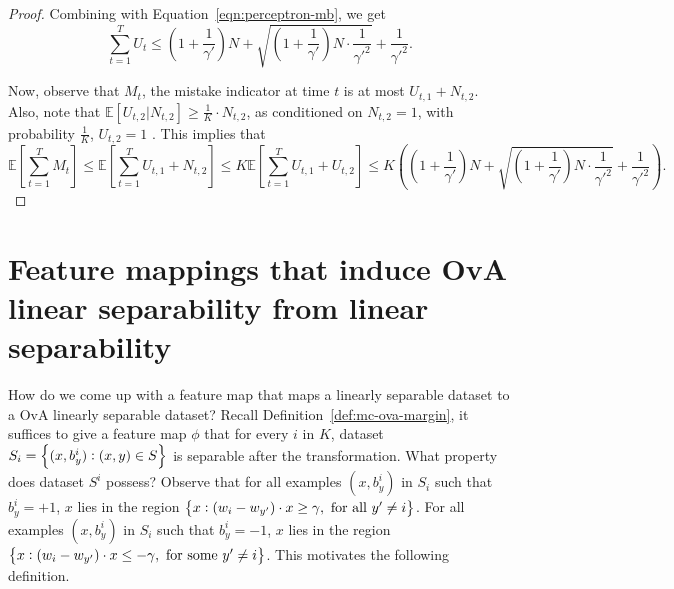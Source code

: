 \documentclass{article}
\newcommand{\field}[1]{\mathbb{#1}}
\newcommand{\E}{\field{E}}
\begin{document}
\begin{proof}
Combining with Equation~\eqref{eqn:perceptron-mb}, we get 
\[
\sum_{t=1}^T U_t  \leq (1 + \frac 1 {\gamma'}) N + \sqrt{ (1 + \frac 1 {\gamma'}) N \cdot \frac{1}{\gamma'^2} } + \frac{1}{\gamma'^2}.
\]

Now, observe that $M_t$, the mistake indicator at time $t$ is at most $U_{t,1} + N_{t,2}$. Also, note that $\E[U_{t,2} | N_{t,2}] \geq \frac 1 K \cdot N_{t,2}$, as conditioned on $N_{t,2} = 1$, with probability $\frac 1 K$, $U_{t,2} = 1$ . This implies that
\[
\E[\sum_{t=1}^T M_t ] \leq \E[\sum_{t=1}^T U_{t,1} + N_{t,2} ] \leq K \E[\sum_{t=1}^T U_{t,1} + U_{t,2} ]  \leq K ((1 + \frac 1 {\gamma'}) N + \sqrt{ (1 + \frac 1 {\gamma'}) N \cdot \frac{1}{\gamma'^2} } + \frac{1}{\gamma'^2}).
\]
\end{proof}


\section{Feature mappings that induce OvA linear separability from linear separability}

How do we come up with a feature map that maps a linearly separable dataset to a OvA linearly separable dataset? Recall Definition~\ref{def:mc-ova-margin}, it suffices to give a feature map $\phi$ that for every $i$ in $K$, dataset $S_i = \cbr{(x, b_y^i): (x,y) \in S}$ is separable after the transformation. What property does dataset $S^i$ possess? Observe that for all examples $(x,b_y^i)$ in $S_i$ such that $b_y^i = +1$, $x$ lies in the region $\cbr{x: (w_i - w_{y'}) \cdot x \geq \gamma, \text{ for all } y' \neq i}$. For all examples $(x,b_y^i)$ in $S_i$ such that $b_y^i = -1$, $x$ lies in the region $\cbr{x: (w_i - w_{y'}) \cdot x \leq -\gamma, \text{ for some } y' \neq i}$.
This motivates the following definition.
\end{document}
